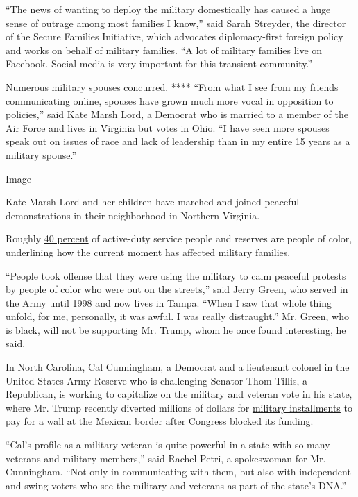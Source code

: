 ``The news of wanting to deploy the military domestically has caused a
huge sense of outrage among most families I know,'' said Sarah Streyder,
the director of the Secure Families Initiative, which advocates
diplomacy-first foreign policy and works on behalf of military families.
``A lot of military families live on Facebook. Social media is very
important for this transient community.''

Numerous military spouses concurred. **** ``From what I see from my
friends communicating online, spouses have grown much more vocal in
opposition to policies,'' said Kate Marsh Lord, a Democrat who is
married to a member of the Air Force and lives in Virginia but votes in
Ohio. ``I have seen more spouses speak out on issues of race and lack of
leadership than in my entire 15 years as a military spouse.''

Image

Kate Marsh Lord and her children have marched and joined peaceful
demonstrations in their neighborhood in Northern Virginia.

Roughly
\href{https://www.pewresearch.org/fact-tank/2017/04/13/6-facts-about-the-u-s-military-and-its-changing-demographics/}{40
percent} of active-duty service people and reserves are people of color,
underlining how the current moment has affected military families.

``People took offense that they were using the military to calm peaceful
protests by people of color who were out on the streets,'' said Jerry
Green, who served in the Army until 1998 and now lives in Tampa. ``When
I saw that whole thing unfold, for me, personally, it was awful. I was
really distraught.'' Mr. Green, who is black, will not be supporting Mr.
Trump, whom he once found interesting, he said.

In North Carolina, Cal Cunningham, a Democrat and a lieutenant colonel
in the United States Army Reserve who is challenging Senator Thom
Tillis, a Republican, is working to capitalize on the military and
veteran vote in his state, where Mr. Trump recently diverted millions of
dollars for
\href{https://www.nytimes.com/2019/03/25/us/politics/border-wall-funding.html}{military
installments} to pay for a wall at the Mexican border after Congress
blocked its funding.

``Cal's profile as a military veteran is quite powerful in a state with
so many veterans and military members,'' said Rachel Petri, a
spokeswoman for Mr. Cunningham. ``Not only in communicating with them,
but also with independent and swing voters who see the military and
veterans as part of the state's DNA.''

